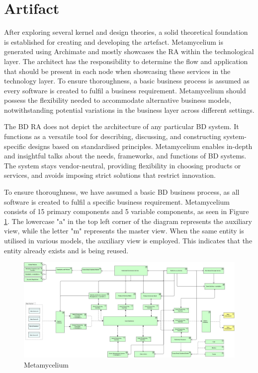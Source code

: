 \documentclass[journal]{IEEEtran}
\begin{document}
\section{Artifact}
\label{sec:artifact}

After exploring several kernel and design theories, a solid theoretical foundation is established for creating and developing the artefact. Metamycelium is generated using Archimate and mostly showcases the RA within the technological layer. The architect has the responsibility to determine the flow and application that should be present in each node when showcasing these services in the technology layer. To ensure thoroughness, a basic business process is assumed as every software is created to fulfil a business requirement. Metamycelium should possess the flexibility needed to accommodate alternative business models, notwithstanding potential variations in the business layer across different settings.

The BD RA does not depict the architecture of any particular BD system. It functions as a versatile tool for describing, discussing, and constructing system-specific designs based on standardised principles. Metamycelium enables in-depth and insightful talks about the needs, frameworks, and functions of BD systems. The system stays vendor-neutral, providing flexibility in choosing products or services, and avoids imposing strict solutions that restrict innovation. 

To ensure thoroughness, we have assumed a basic BD business process, as all software is created to fulfil a specific business requirement. Metamycelium consists of 15 primary components and 5 variable components, as seen in Figure \ref{fig:Metamycelium}. The lowercase "a" in the top left corner of the diagram represents the auxiliary view, while the letter "m" represents the master view. When the same entity is utilised in various models, the auxiliary view is employed. This indicates that the entity already exists and is being reused. 


\begin{figure}
  \centering
  \includegraphics[width=\linewidth]{images/Metamycelium.jpg}
  \caption{Metamycelium}
  \label{fig:Metamycelium}
\end{figure}
\end{document}
